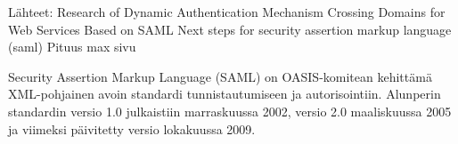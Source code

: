 Lähteet:
Research of Dynamic Authentication Mechanism Crossing Domains for Web Services Based on SAML \cite{dynamic_saml}
Next steps for security assertion markup language (saml) \cite{next_saml}
Pituus max sivu

Security Assertion Markup Language (SAML) on OASIS-komitean kehittämä XML-pohjainen avoin standardi tunnistautumiseen ja autorisointiin. Alunperin standardin versio 1.0 julkaistiin marraskuussa 2002, versio 2.0 maaliskuussa 2005 ja viimeksi päivitetty versio lokakuussa 2009.
